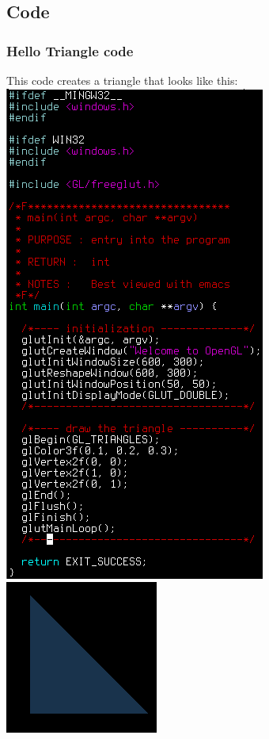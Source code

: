 \documentclass{beamer}
\begin{document}
          \subsection{Code}
          \begin{frame}
            \frametitle{Hello Triangle code}
            \begin{center}
              This code creates a triangle that looks like this:
              \includegraphics[scale=.3]{code.png} \hspace{5mm}
              \includegraphics[scale=.8]{result.png}
            \end{center}
          \end{frame}
\end{document}
